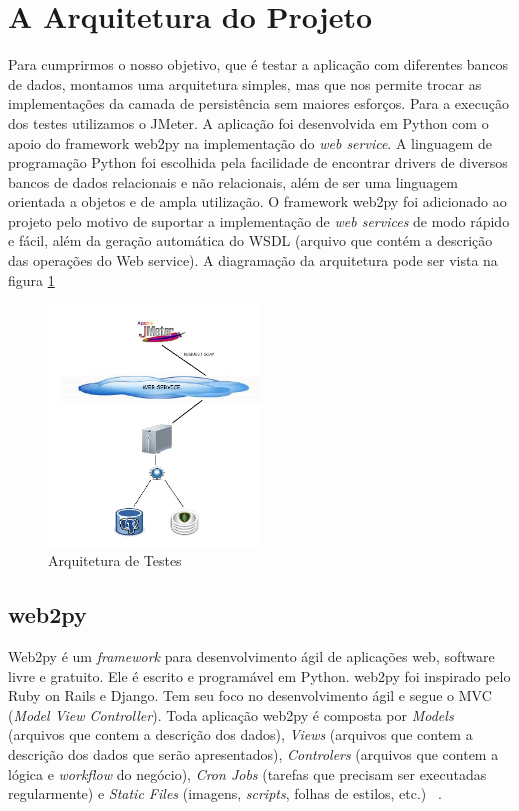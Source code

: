 \section{A Arquitetura do Projeto}

Para cumprirmos o nosso objetivo, que é testar a aplicação com diferentes bancos de dados, montamos uma arquitetura simples, mas que nos permite trocar as implementações da camada de persistência sem maiores esforços. Para a execução dos testes utilizamos o JMeter. A aplicação foi desenvolvida em Python com o apoio do framework web2py na implementação do \textit{web service}. A linguagem de programação Python foi escolhida pela facilidade de encontrar drivers de diversos bancos de dados relacionais e não relacionais, além de ser uma linguagem orientada a objetos e de ampla utilização. O framework web2py foi adicionado ao projeto pelo motivo de suportar a implementação de \textit{web services} de modo rápido e fácil, além da geração automática do WSDL (arquivo que contém a descrição das operações do Web service). A diagramação da arquitetura pode ser vista na figura \ref{fig:arquitetura}

	\begin{figure}[!htbp]
		\begin{center}
			\includegraphics[width=0.5\textwidth]{arquitetura}
		\end{center}
		\caption{Arquitetura de Testes}
		\label{fig:arquitetura}
	\end{figure}

\subsection{web2py}

Web2py é um \textit{framework} para desenvolvimento ágil de aplicações web, software livre e gratuito. Ele é escrito e programável em Python. web2py foi inspirado pelo Ruby on Rails e Django. Tem seu foco no desenvolvimento ágil e segue o MVC (\textit{Model View Controller}). Toda aplicação web2py é composta por \textit{Models} (arquivos que contem a descrição dos dados), \textit{Views} (arquivos que contem a descrição dos dados que serão apresentados), \textit{Controlers} (arquivos que contem a lógica e \textit{workflow} do negócio), \textit{Cron Jobs} (tarefas que precisam ser executadas regularmente) e \textit{Static Files} (imagens, \textit{scripts}, folhas de estilos, etc.) ~\cite{siteweb2py}.

